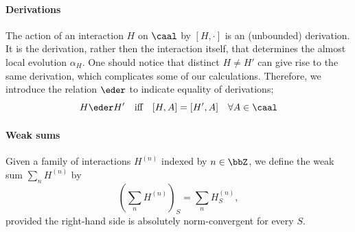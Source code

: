 \paragraph{Derivations}\label{sec: derivations}
The action of an interaction $H$ on $\caal$ by $[H,\cdot]$ is an (unbounded) derivation. It is the derivation, rather then the interaction itself, that determines the almost local evolution $\alpha_H$. 
One should notice that distinct $H\neq H'$ can give rise to the same derivation, which complicates some of our calculations. Therefore, we introduce the relation $\eder$ to indicate equality of derivations;
$$
H \eder H' \quad \text{iff} \quad   [H,A]=[H',A] \quad \forall A \in\caal
$$




\paragraph{Weak sums} 
Given a family of interactions $H^{(n)}$ indexed by $n\in \bbZ$, we define the weak sum $\sum_n H^{(n)}$ by
$$
(\sum_n H^{(n)})_S=  \sum_n H^{(n)}_S, 
$$ 
provided the right-hand side is absolutely norm-convergent for every $S$. 
